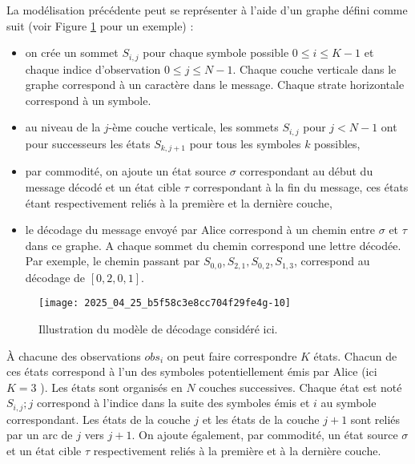 La modélisation précédente peut se représenter à l'aide d'un graphe défini comme suit (voir Figure \ref{fig_ccmp_2024_info_03} pour un exemple) :

\begin{itemize}
  \item on crée un sommet $S_{i, j}$ pour chaque symbole possible $0 \leqslant i \leqslant K-1$ et chaque indice d'observation $0 \leqslant j \leqslant N-1$. Chaque couche verticale dans le graphe correspond à un caractère dans le message. Chaque strate horizontale correspond à un symbole.
  \item au niveau de la $j$-ème couche verticale, les sommets $S_{i, j}$ pour $j<N-1$ ont pour successeurs les états $S_{k, j+1}$ pour tous les symboles $k$ possibles,
  \item par commodité, on ajoute un état source $\sigma$ correspondant au début du message décodé et un état cible $\tau$ correspondant à la fin du message, ces états étant respectivement reliés à la première et la dernière couche,
  \item le décodage du message envoyé par Alice correspond à un chemin entre $\sigma$ et $\tau$ dans ce graphe. A chaque sommet du chemin correspond une lettre décodée. Par exemple, le chemin passant par $S_{0,0}, S_{2,1}, S_{0,2}, S_{1,3}$, correspond au décodage de $[0,2,0,1]$.\\
\end{itemize}

\begin{figure}
\centering
\texttt{[image: 2025\_04\_25\_b5f58c3e8cc704f29fe4g-10]}
\caption{Illustration du modèle de décodage considéré ici. \label{fig_ccmp_2024_info_03}}
\end{figure}

À chacune des observations $o b s_{i}$ on peut faire correspondre $K$ états. Chacun de ces états correspond à l'un des symboles potentiellement émis par Alice (ici $K=3$ ). Les états sont organisés en $N$ couches successives. Chaque état est noté $S_{i, j} ; j$ correspond à l'indice dans la suite des symboles émis et $i$ au symbole correspondant. Les états de la couche $j$ et les états de la couche $j+1$ sont reliés par un arc de $j$ vers $j+1$. On ajoute également, par commodité, un état source $\sigma$ et un état cible $\tau$ respectivement reliés à la première et à la dernière couche.


